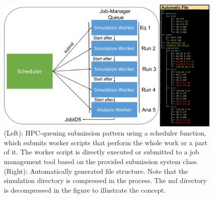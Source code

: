 \begin{figure}[h]
    \centering
    \includegraphics[width=\textwidth]{fig/implementation/SimulationExecutionManagment.png}
    \caption{(Left): HPC-queuing submission pattern using a scheduler function, which submits worker scripts that perform the whole work or a part of it. The worker script is directly executed or submitted to a job management tool based on the provided submission system class. (Right): Automatically generated file structure. Note that the simulation directory is compressed in the process. The md directory is decompressed in the figure to illustrate the concept.
    }
    \label{fig: SimulationExecPattern}
\end{figure}

